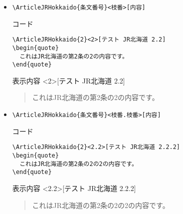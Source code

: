 \documentclass[oneside,10pt,a4paper]{jsarticle}
\begin{document}
\begin{itemize}
\begin{itembox}[l]{コード}
{\begin{verbatim}
\ArticleJRHokkaido{2}[テスト JR北海道 2]
\begin{quote}
  これはJR北海道の第2条の内容です。
\end{quote}\end{verbatim}}
      \end{itembox}
      \begin{itembox}[l]{表示内容}
        [テスト JR北海道 2]
        \begin{quote}
          これはJR北海道の第2条の内容です。
        \end{quote}
      \end{itembox}
    \item \verb|\ArticleJRHokkaido{条文番号}<枝番>[内容]|
      \begin{itembox}[l]{コード}
        {\footnotesize\begin{verbatim}
\ArticleJRHokkaido{2}<2>[テスト JR北海道 2.2]
\begin{quote}
  これはJR北海道の第2条の2の内容です。
\end{quote}\end{verbatim}}
      \end{itembox}
      \begin{itembox}[l]{表示内容}
        <2>[テスト JR北海道 2.2]
        \begin{quote}
          これはJR北海道の第2条の2の内容です。
        \end{quote}
      \end{itembox}
    \item \verb|\ArticleJRHokkaido{条文番号}<枝番.枝番>[内容]|
      \begin{itembox}[l]{コード}
        {\footnotesize\begin{verbatim}
\ArticleJRHokkaido{2}<2.2>[テスト JR北海道 2.2.2]
\begin{quote}
  これはJR北海道の第2条の2の2の内容です。
\end{quote}\end{verbatim}}
      \end{itembox}
      \begin{itembox}[l]{表示内容}
        <2.2>[テスト JR北海道 2.2.2]
        \begin{quote}
          これはJR北海道の第2条の2の2の内容です。
        \end{quote}
      \end{itembox}
  \end{itemize}
  \newpage
\end{document}
